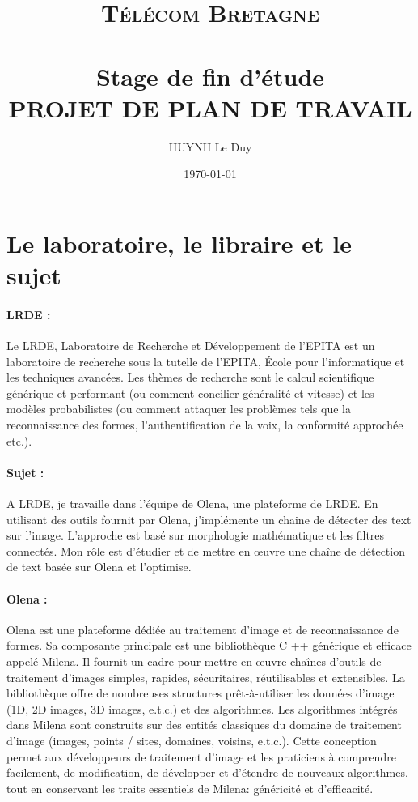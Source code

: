 \documentclass[12pt,a4paper]{article}
\title{	
\normalfont \normalsize 
\textsc{Télécom Bretagne} \\ [25pt] %
\horrule{0.5pt} \\[0.4cm] %
\huge Stage de fin d'étude \\ %
\textsc{PROJET DE PLAN DE TRAVAIL}
\horrule{2pt} \\[0.5cm] %
}
\author{HUYNH Le Duy} %
\date{\normalsize\today} %
\begin{document}
\maketitle %
\section{Le laboratoire, le libraire et le sujet}
	\paragraph{LRDE :}
	Le LRDE, Laboratoire de Recherche et Développement de l'EPITA est un laboratoire de recherche sous la tutelle de l'EPITA,  École pour l'informatique et les techniques avancées. Les thèmes de recherche sont le calcul scientifique générique et performant (ou comment concilier généralité et vitesse) et les modèles probabilistes (ou comment attaquer les problèmes tels que la reconnaissance des formes, l'authentification de la voix, la conformité approchée etc.).
	\paragraph{Sujet :}
A LRDE, je travaille dans l'équipe de Olena, une plateforme de LRDE. En utilisant des outils fournit par Olena, j'implémente un chaine de détecter des text sur l'image. L'approche est basé sur morphologie mathématique et les filtres connectés. Mon rôle est d'étudier et de mettre en œuvre une chaîne de détection de text basée sur Olena et l'optimise.
	
	\paragraph{Olena :}
Olena est une plateforme dédiée au traitement d'image et de reconnaissance de formes. Sa composante principale est une bibliothèque C ++ générique et efficace appelé Milena. Il fournit un cadre pour mettre en œuvre chaînes d'outils de traitement d'images simples, rapides, sécuritaires, réutilisables et extensibles. La bibliothèque offre de nombreuses structures prêt-à-utiliser les données d'image (1D, 2D images, 3D images, e.t.c.) et des algorithmes. Les algorithmes intégrés dans Milena sont construits sur des entités classiques du domaine de traitement d'image (images, points / sites, domaines, voisins, e.t.c.). Cette conception permet aux développeurs de traitement d'image et les praticiens à comprendre facilement, de modification, de développer et d'étendre de nouveaux algorithmes, tout en conservant les traits essentiels de Milena: généricité et d'efficacité.
\end{document}
